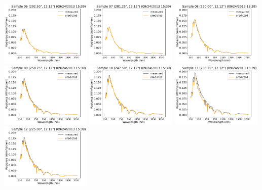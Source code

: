 \begin{center}
\includegraphics[width=0.325\textwidth]{img/09241539_s06.pdf}
\includegraphics[width=0.325\textwidth]{img/09241539_s07.pdf}
\includegraphics[width=0.325\textwidth]{img/09241539_s08.pdf}\\
\includegraphics[width=0.325\textwidth]{img/09241539_s09.pdf}
\includegraphics[width=0.325\textwidth]{img/09241539_s10.pdf}
\includegraphics[width=0.325\textwidth]{img/09241539_s11.pdf}\\
\includegraphics[width=0.325\textwidth]{img/09241539_s12.pdf}

\end{center}
